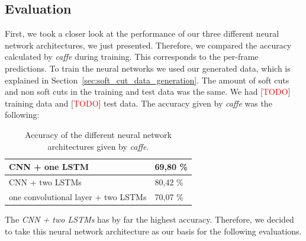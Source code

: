 \subsection{Evaluation}
\label{sec:soft_cut_evaluation}

First, we took a closer look at the performance of our three different neural network architectures, we just presented.
Therefore, we compared the accuracy calculated by \textit{caffe} during training.
This corresponds to the per-frame predictions.
To train the neural networks we used our generated data, which is explained in Section~\ref{sec:soft_cut_data_generation}.
The amount of soft cuts and non soft cuts in the training and test data was the same.
We had [\textcolor{red}{TODO}] training data and [\textcolor{red}{TODO}] test data.
The accuracy given by \textit{caffe} was the following:
\begin{table}[ht]
	\centering
	\begin{tabular}{l|l}
	CNN + one LSTM                      & 69,80 \% \\ \hline
	CNN + two LSTMs                     & 80,42 \% \\ \hline
	one convolutional layer + two LSTMs & 70,07 \% \\
	\end{tabular}
	\caption{Accuracy of the different neural network architectures given by \textit{caffe}.}
	\label{tab:caffe_accurary}
\end{table}
The \textit{CNN + two LSTMs} has by far the highest accuracy.
Therefore, we decided to take this neural network architecture as our basis for the following evaluations.

